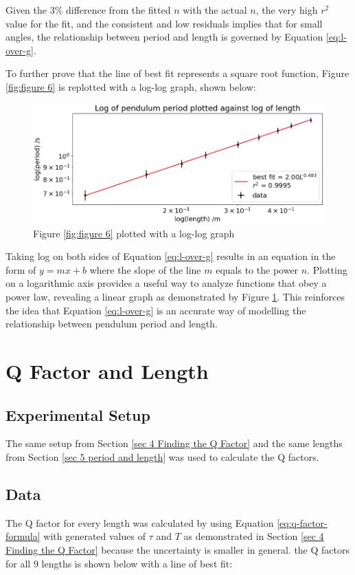 \documentclass[11pt]{article}
\begin{document}
\begin{multicols}{2}
Given the 3\% difference from the fitted $n$ with the actual $n$, the very high $r^2$ value for the fit, and the consistent and low residuals implies that for small angles, the relationship between period and length is governed by Equation \ref{eq:l-over-g}.


To further prove that the line of best fit represents a square root function, Figure \ref{fig:figure 6} is replotted with a log-log graph, shown below:

\begin{figure}[H]
    \centering
    \includegraphics[width=\linewidth]{../figures/period_vs_length_log.png}
    \caption[]{Figure \ref{fig:figure 6} plotted with a log-log graph}
    \label{fig:figure 7}
\end{figure}

Taking log on both sides of Equation \ref{eq:l-over-g} results in an equation in the form of $y = mx + b$ where the slope of the line $m$ equals to the power $n$. Plotting on a logarithmic axis provides a useful way to analyze functions that obey a power law, revealing a linear graph as demonstrated by Figure \ref{fig:figure 7}. This reinforces the idea that Equation \ref{eq:l-over-g} is an accurate way of modelling the relationship between pendulum period and length.


\section{Q Factor and Length}

\subsection{Experimental Setup}
The same setup from Section \ref{sec 4 Finding the Q Factor} and the same lengths from Section \ref{sec 5 period and length} was used to calculate the Q factors.

{\color{blue}

\subsection{Data}
The Q factor for every length was calculated by using Equation \ref{eq:q-factor-formula} with generated values of $\tau$ and $T$ as demonstrated in Section \ref{sec 4 Finding the Q Factor} because the uncertainty is smaller in general. the Q factors for all 9 lengths is shown below with a line of best fit:

}
\end{multicols}
\end{document}
